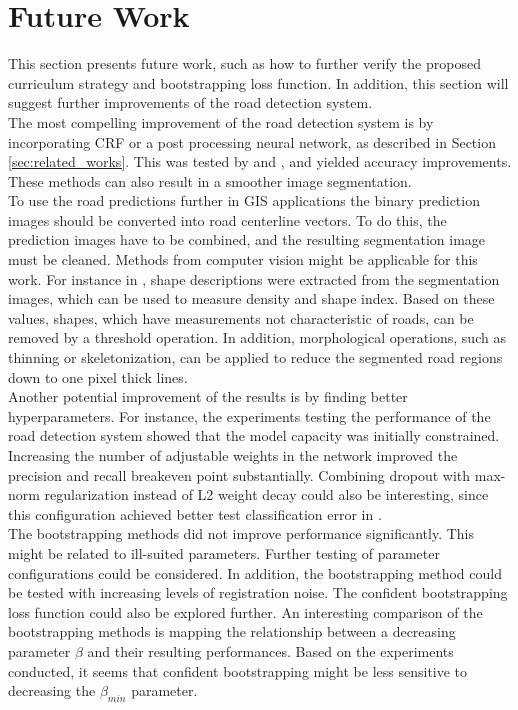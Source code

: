 \section{Future Work}
\label{sec:futureWork}
This section presents future work, such as how to further verify the proposed curriculum strategy and bootstrapping loss function. In addition, this section will suggest further improvements of the road detection system.\\

The most compelling improvement of the road detection system is by incorporating \ac{CRF} or a post processing neural network, as described in Section \ref{sec:related_works}. This was tested by \cite{Kluckner_semantic_height} and \cite{Mnih_aerial_images_noisy}, and yielded accuracy improvements. These methods can also result in a smoother image segmentation. \\

To use the road predictions further in GIS applications the binary prediction images should be converted into road centerline vectors. To do this, the prediction images have to be combined, and the resulting segmentation image must be cleaned. Methods from computer vision might be applicable for this work. For instance in \citep{Song_road_extraction_svm}, shape descriptions were extracted from the segmentation images, which can be used to measure density and shape index. Based on these values, shapes, which have measurements not characteristic of roads, can be removed by a threshold operation. In addition, morphological operations, such as thinning or skeletonization, can be applied to reduce the segmented road regions down to one pixel thick lines.\\

Another potential improvement of the results is by finding better hyperparameters. For instance, the experiments testing the performance of the road detection system showed that the model capacity was initially constrained. Increasing the number of adjustable weights in the network improved the precision and recall breakeven point substantially. Combining dropout with max-norm regularization instead of L2 weight decay could also be interesting, since this configuration achieved better test classification error in \citep{Srivastava_dropout}.\\

The bootstrapping methods did not improve performance significantly. This might be related to ill-suited parameters. Further testing of parameter configurations could be considered. In addition, the bootstrapping method could be tested with increasing levels of registration noise. The confident bootstrapping loss function could also be explored further. An interesting comparison of the bootstrapping methods is mapping the relationship between a decreasing parameter $\beta$ and their resulting performances. Based on the experiments conducted, it seems that confident bootstrapping might be less sensitive to decreasing the $\beta_{min}$ parameter.\\

